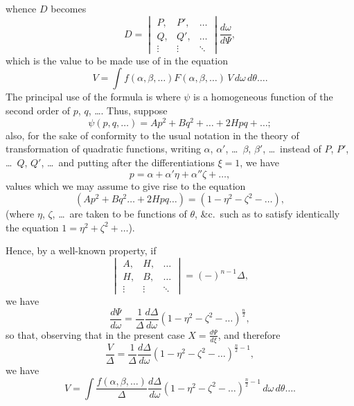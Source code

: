 \documentclass[11pt,a4paper]{book}
\begin{document}
\newpage

\setcounter{page}{441}

whence $D$ becomes
\[
D = \begin{vmatrix}
P, & P', & \ldots \\
Q, & Q', & \ldots \\
\vdots & \vdots & \ddots
\end{vmatrix}
\frac{d\omega}{d\Psi},
\]
which is the value to be made use of in the equation
\[
V = \int f(\alpha, \beta, \ldots)F(\alpha, \beta, \ldots)\, V\, d\omega\, d\theta\ldots.
\]
The principal use of the formula is where $\psi$ is a homogeneous function of the second order of $p$, $q$, \ldots. Thus, suppose
\[
\psi(p, q, \ldots) = Ap^{2} + Bq^{2} + \ldots + 2Hpq + \ldots;
\]
also, for the sake of conformity to the usual notation in the theory of transformation of quadratic functions, writing $\alpha$, $\alpha'$, \ldots\ $\beta$, $\beta'$, \ldots\ instead of $P$, $P'$, \ldots\ $Q$, $Q'$, \ldots\ and putting after the differentiations $\xi = 1$, we have
\[
p = \alpha + \alpha'\eta + \alpha''\zeta + \ldots,
\]
values which we may assume to give rise to the equation
\[
(Ap^{2} + Bq^{2} \ldots + 2Hpq \ldots) = (1 - \eta^{2} - \zeta^{2} - \ldots),
\]
(where $\eta$, $\zeta$, \ldots\ are taken to be functions of $\theta$, \&c.\ such as to satisfy identically the equation $1 = \eta^{2} + \zeta^{2} + \ldots$).

Hence, by a well-known property, if
\[
\begin{vmatrix}
A, & H, & \ldots \\
H, & B, & \ldots \\
\vdots & \vdots & \ddots
\end{vmatrix}
= (-)^{n-1}\Delta,
\]
we have
\[
\frac{d\Psi}{d\omega} = \frac{1}{\Delta}\frac{d\Delta}{d\omega}(1 - \eta^{2} - \zeta^{2} - \ldots)^{\frac{n}{2}},
\]
so that, observing that in the present case $X = \frac{d\Psi}{d\xi}$, and therefore
\[
\frac{V}{\Delta} = \frac{1}{\Delta}\frac{d\Delta}{d\omega}(1 - \eta^{2} - \zeta^{2} - \ldots)^{\frac{n}{2}-1},
\]
we have
\[
V = \int \frac{f(\alpha, \beta, \ldots)}{\Delta}\frac{d\Delta}{d\omega}(1 - \eta^{2} - \zeta^{2} - \ldots)^{\frac{n}{2}-1}\, d\omega\, d\theta\ldots.
\]

\newpage

\setcounter{page}{442}
\end{document}
